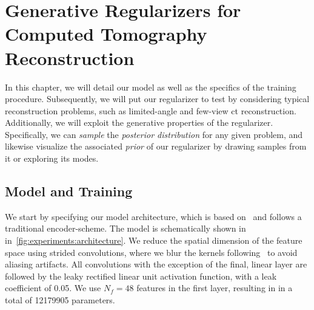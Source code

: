 \documentclass[../ml-ct.tex]{subfiles}
\begin{document}
\chapter{Generative Regularizers for Computed Tomography Reconstruction}%
\label{chap:experiments}

\minitoc%
In this chapter, we will detail our model as well as the specifics of the training procedure.
Subsequently, we will put our regularizer to test by considering typical reconstruction problems, such as limited-angle and few-view \gls{ct} reconstruction.
Additionally, we will exploit the generative properties of the regularizer.
Specifically, we can \emph{sample} the \emph{posterior distribution} for any given problem, and likewise visualize the associated \emph{prior} of our regularizer by drawing samples from it or exploring its modes.

\section{Model and Training}%
\label{sec:experiments}
We start by specifying our model architecture, which is based on~\cite{nijkamp_anatomy_2019} and follows a traditional encoder-scheme.
The model is schematically shown in in~\cref{fig:experiments:architecture}.
We reduce the spatial dimension of the feature space using strided convolutions, where we blur the kernels following~\cite{zhang_convolutional_2019} to avoid aliasing artifacts.
All convolutions with the exception of the final, linear layer are followed by the leaky rectified linear unit activation function, with a leak coefficient of \num{0.05}.
We use \( N_f = \num{48} \) features in the first layer, resulting in in a total of \num{12179905} parameters.
\end{document}
